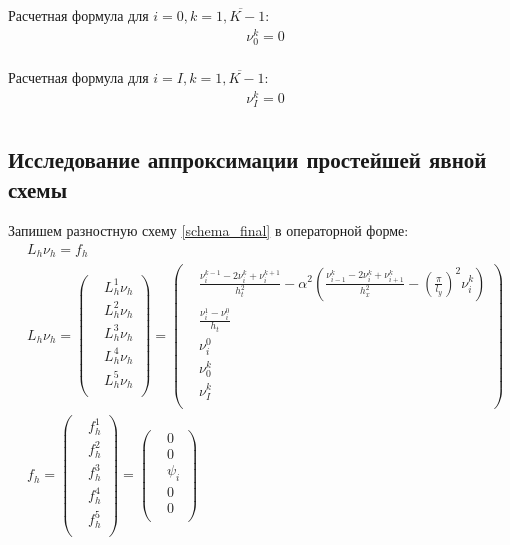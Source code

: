 {{		Расчетная формула для $i =  0, k =  \overline{ 1, K-1}$:
		\begin{equation} \label{solution_i0}
		\begin{split}
		& \nu^{k}_0 = 0 \\
		\end{split}
		\end{equation}
		
		Расчетная формула для $i =  I, k =  \overline{ 1, K-1}$:
		\begin{equation} \label{solution_i0}
		\begin{split}
		& \nu^{k}_I = 0 \\
		\end{split}
		\end{equation}
}

	\subsection{Исследование аппроксимации простейшей явной схемы}{
		Запишем разностную схему \eqref{schema_final} в операторной форме:
		\begin{equation}\label{operator_form}
			\begin{split}
			& L_h\nu_h = f_h \\
			& L_h\nu_h = 
			\left(\begin{split}
				& L^1_h\nu_h \\
				& L^2_h\nu_h \\ 
				& L^3_h\nu_h \\ 
				& L^4_h\nu_h \\ 
				& L^5_h\nu_h \\ 
				\end{split}
			\right) 
			=
			\left(\begin{split}
				&\frac{\nu^{k-1}_i - 2\nu^{k}_i + \nu^{k+1}_i}{h_t^2} - \alpha^2\left(\frac{\nu^{k}_{i-1} - 2\nu^{k}_i + \nu^{k}_{i+1}}{h_x^2} - \left(\frac{\pi}{l_y}\right)^2 \nu^{k}_i\right)\\
				& \frac{\nu^1_i - \nu^0_i}{h_t} \\ 
				& \nu^0_i \\
				& \nu^k_0 \\
				& \nu^k_I \\
				\end{split}
			\right) \\
			& f_h = 
			\left(\begin{split}
				& f^1_h \\
				& f^2_h \\
				& f^3_h \\
				& f^4_h \\
				& f^5_h \\
				\end{split}
			\right) 
			=
			\left(\begin{split}
				& 0 \\
				& 0 \\
				& \psi_i \\
				& 0 \\
				& 0 \\
				\end{split}
			\right) 
			\end{split}
		\end{equation}
		
}}
